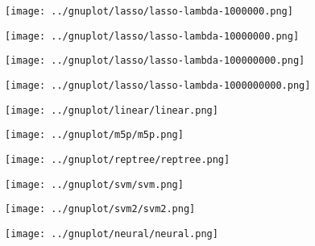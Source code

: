 \documentclass[10pt,a4paper]{article}
\begin{document}
\texttt{[image: ../gnuplot/lasso/lasso-lambda-1000000.png]}

\texttt{[image: ../gnuplot/lasso/lasso-lambda-10000000.png]}

\texttt{[image: ../gnuplot/lasso/lasso-lambda-100000000.png]}

\texttt{[image: ../gnuplot/lasso/lasso-lambda-1000000000.png]}

\texttt{[image: ../gnuplot/linear/linear.png]}

\texttt{[image: ../gnuplot/m5p/m5p.png]}

\texttt{[image: ../gnuplot/reptree/reptree.png]}

\texttt{[image: ../gnuplot/svm/svm.png]}

\texttt{[image: ../gnuplot/svm2/svm2.png]}

\texttt{[image: ../gnuplot/neural/neural.png]}
\end{document}
